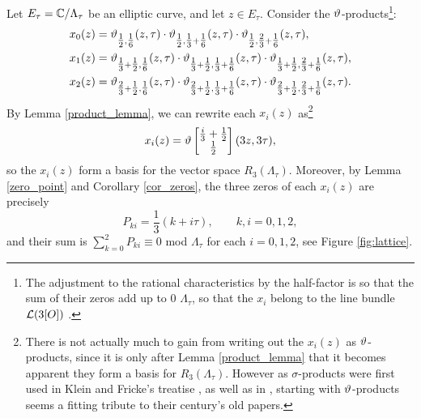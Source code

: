 Let $E_{\tau} = \mathbb{C}/\Lambda_{\tau}$ be an elliptic curve, and let $z \in E_{\tau}$. Consider the $\vartheta$-products\footnote{The adjustment to the rational characteristics by the half-factor is so that the sum of their zeros add up to 0  $\Lambda_{\tau}$, so that the $x_{i}$ belong to the line bundle $\mathcal{L}(3[O])$ \cite{Hulek_1983}.}:
\begin{equation*}
	\begin{split}
	x_{0}(z) &= \vartheta_{\tfrac{1}{2},\tfrac{1}{6}}(z,\tau)\cdot\vartheta_{\tfrac{1}{2},\tfrac{1}{3}+\tfrac{1}{6}}(z,\tau)\cdot\vartheta_{\tfrac{1}{2},\tfrac{2}{3}+\tfrac{1}{6}}(z,\tau),\\
	x_{1}(z) &= \vartheta_{\tfrac{1}{3}+\tfrac{1}{2},\tfrac{1}{6}}(z,\tau)\cdot\vartheta_{\tfrac{1}{3}+\tfrac{1}{2},\tfrac{1}{3}+\tfrac{1}{6}}(z,\tau)\cdot\vartheta_{\tfrac{1}{3}+\tfrac{1}{2},\tfrac{2}{3}+\tfrac{1}{6}}(z,\tau),\\
	x_{2}(z) &= \vartheta_{\tfrac{2}{3}+\tfrac{1}{2},\tfrac{1}{6}}(z,\tau)\cdot\vartheta_{\tfrac{2}{3}+\tfrac{1}{2},\tfrac{1}{3}+\tfrac{1}{6}}(z,\tau)\cdot\vartheta_{\tfrac{2}{3}+\tfrac{1}{2},\tfrac{2}{3}+\tfrac{1}{6}}(z,\tau).
	\end{split}
\end{equation*}
By Lemma \ref{product_lemma}, we can rewrite each $x_{i}(z)$ as\footnote{There is not actually much to gain from writing out the $x_{i}(z)$ as $\vartheta$-products, since it is only after Lemma \ref{product_lemma} that it becomes apparent they form a basis for $R_{3}(\Lambda_{\tau})$. However as $\sigma$-products were first used in Klein and Fricke's treatise \cite{KF_1892}, as well as in \cite{Bianchi_1880,Hurtwiz_1886}, starting with $\vartheta$-products seems a fitting tribute to their century's old papers.}
\begin{equation*}
	x_{i}(z) = \vartheta\begin{bmatrix} \frac{i}{3} + \frac{1}{2}\\ \frac{1}{2} \end{bmatrix}(3z,3\tau),
\end{equation*}
so the $x_{i}(z)$ form a basis for the vector space $R_{3}(\Lambda_{\tau})$. Moreover, by Lemma \ref{zero_point} and Corollary \ref{cor_zeros}, the three zeros of each $x_{i}(z)$ are precisely
\begin{equation}
	\label{hesse_zeros}
	P_{ki} = \frac{1}{3}(k + i\tau),\qquad k,i = 0,1,2,
\end{equation} 
and their sum is $\sum_{k=0}^{2}P_{ki} \equiv 0$ mod $\Lambda_{\tau}$ for each $i = 0,1,2$, see Figure \ref{fig:lattice}.

